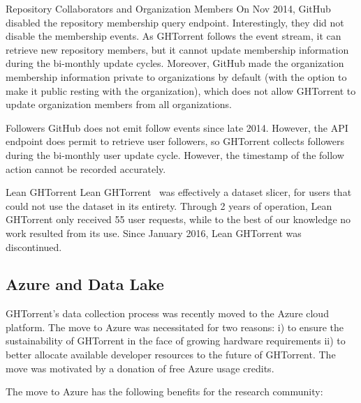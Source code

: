 \documentclass{sig-alternate}
\begin{document}
\begin{compactdesc}

  \item[Repository Collaborators and Organization Members] On Nov 2014, GitHub
    disabled the repository membership query endpoint. Interestingly, they did
    not disable the membership events. As GHTorrent follows the event stream, it
    can retrieve new repository members, but it cannot update membership
    information during the bi-monthly update cycles. Moreover, GitHub made the
    organization membership information private to organizations by default
    (with the option to make it public resting with the organization), which
    does not allow GHTorrent to update organization members from all
    organizations.

  \item[Followers] GitHub does not emit follow events since late 2014. However,
    the API endpoint does permit to retrieve user followers, so GHTorrent
    collects followers during the bi-monthly user update cycle. However, the
    timestamp of the follow action cannot be recorded accurately.

  \item[Lean GHTorrent] Lean GHTorrent~\cite{GVSZ14} was effectively a dataset
    slicer, for users that could not use the dataset in its entirety. Through 2
    years of operation, Lean GHTorrent only received 55 user requests, while to
    the best of our knowledge no work resulted from its use. Since January 2016,
    Lean GHTorrent was discontinued.

\end{compactdesc}

\subsection{Azure and Data Lake}

GHTorrent's data collection process was recently moved to the Azure cloud
platform. The move to Azure was necessitated for two reasons: i) to ensure the
sustainability of GHTorrent in the face of growing hardware requirements ii) to
better allocate available developer resources to the future of GHTorrent. The
move was motivated by a donation of free Azure usage credits.

The move to Azure has the following benefits for the research community:
\end{document}
